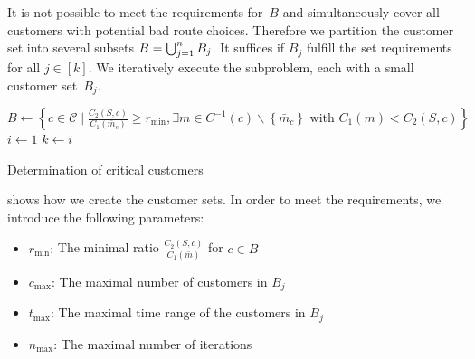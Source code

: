 It is not possible to meet the requirements for~$B$ and simultaneously cover all customers with potential bad route choices. Therefore we partition the customer set into several subsets ${B=\bigcup_{j=1}^n B_j}$. It suffices if $B_j$ fulfill the set requirements for all ${j\in[k]}$. We iteratively execute the subproblem, each with a small customer set~$B_j$.

\begin{algorithm}[htb]
	\SetAlgoLined
	$B\gets\left\{c\in\mathcal{C}\mid\frac{C_2(S,c)}{C_1\left(\bar{m}_c\right)}\geq r_{\min}, \exists m\in C^{-1}(c)\backslash\left\{\bar{m}_c\right\} \text{ with } C_1(m)<C_2(S,c)\right\}$\;
	$i\gets 1$\;
	$k\gets i$\;
	\caption{Determination of critical customers}
	\label{alg:critical_customers}
\end{algorithm}

 shows how we create the customer sets. In order to meet the requirements, we introduce the following parameters:
\begin{itemize}
	\item{$r_{\min}$:} The minimal ratio $\frac{C_2(S,c)}{C_1\left(\bar{m}\right)}$ for ${c\in B}$
	\item{$c_{\max}$:} The maximal number of customers in $B_j$
	\item{$t_{\max}$:} The maximal time range of the customers in $B_j$
	\item{$n_{\max}$:} The maximal number of iterations
\end{itemize}

